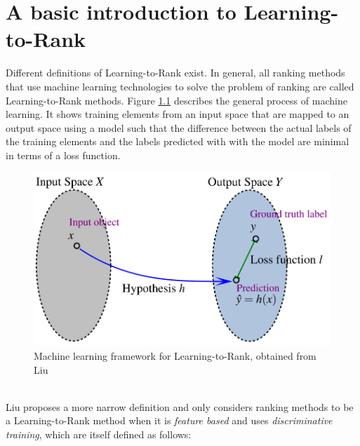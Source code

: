 \chapter{A basic introduction to Learning-to-Rank}
Different definitions of Learning-to-Rank exist. In general, all ranking methods that use machine learning technologies to solve the problem of ranking are called Learning-to-Rank methods. Figure \ref{fig:discriminative_training} describes the general process of machine learning. It shows training elements from an input space that are mapped to an output space using a model such that the difference between the actual labels of the training elements and the labels predicted with with the model are minimal in terms of a loss function.
\begin{figure}[!h]
\includegraphics[scale=0.26]{gfx/descriminative_training}
\caption{Machine learning framework for Learning-to-Rank, obtained from Liu \cite{Liu2007}}
\label{fig:discriminative_training}
\end{figure}\\
Liu \cite{Liu2007} proposes a more narrow definition and only considers ranking methods to be a Learning-to-Rank method when it is \emph{feature based} and uses \emph{discriminative training}, which are itself defined as follows:
